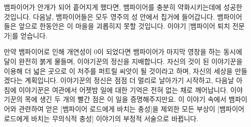 \documentclass{report}
\begin{document}
	뱀파이어가 안개가 되어 흩어지게 했다면, 뱀파이어를 충분히 약화시키는데에 성공한 것입니다. 다음날, 뱀파이어들은 모두 영주의 성 안에서 칩거에 들어갑니다. 뱀파이어들은 앞으로 한동안은 이 마을을 괴롭히지 못할 것입니다. 이야기 [뱀파이어 퇴치 전문가]를 얻습니다.
	
	만약 뱀파이어로 인해 개연성이 0이 되었다면 뱀파이어가 마지막 영창을 하는 동시에 달이 완전히 붉게 물들며, 이야기꾼의 정신을 지배합니다. 자신의 것이 된 이야기꾼을 이용해 더 넓은 곳으로 이 저주를 퍼트릴 씨앗이 될 것이라고 하며, 자신의 세상을 만들겠다는 계획입니다. 이야기꾼의 정신은 점점 더 멀리로 날아가기 시작하고, 다음날 아침에 이야기꾼은 여관에서 어젯밤 일에 대한 기억은 전혀 없는 채로 깨어납니다. 이야기꾼의 목에 생긴 두 개의 빨간 점은 이 일을 증명해주지만요. 이 이야기 속에서 뱀파이어와 관련하여 얻은 [뱀파이어 로드에게 바치는 충성]을 제외한 모든 부상이 \hypertarget{vamp-master}{[뱀파이어 로드에게 바치는 무의식적 충성]} 이야기의 부정적 서술으로 바뀝니다.
	
	
\end{document}
